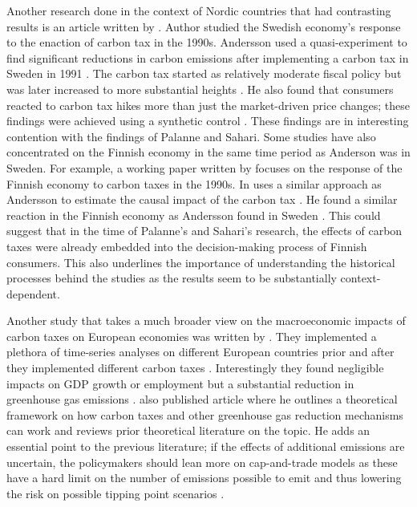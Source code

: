 \documentclass[
  12pt,
  a4paper,
]{report}
\begin{document}
Another research done in the context of Nordic countries that had contrasting results is an article written by \citet{andersson2019}. Author studied the Swedish economy's response to the enaction of carbon tax in the 1990s. Andersson used a quasi-experiment to find significant reductions in carbon emissions after implementing a carbon tax in Sweden in 1991 \citep{andersson2019}. The carbon tax started as relatively moderate fiscal policy but was later increased to more substantial heights \citep{andersson2019}. He also found that consumers reacted to carbon tax hikes more than just the market-driven price changes; these findings were achieved using a synthetic control \citep{andersson2019}. These findings are in interesting contention with the findings of Palanne and Sahari. Some studies have also concentrated on the Finnish economy in the same time period as Anderson was in Sweden. For example, a working paper written by \citet{elbaum2021} focuses on the response of the Finnish economy to carbon taxes in the 1990s. In uses a similar approach as Andersson to estimate the causal impact of the carbon tax \citep{elbaum2021}. He found a similar reaction in the Finnish economy as Andersson found in Sweden \citep{elbaum2021}. This could suggest that in the time of Palanne's and Sahari's research, the effects of carbon taxes were already embedded into the decision-making process of Finnish consumers. This also underlines the importance of understanding the historical processes behind the studies as the results seem to be substantially context-dependent.

Another study that takes a much broader view on the macroeconomic impacts of carbon taxes on European economies was written by \citet{metcalf2020}. They implemented a plethora of time-series analyses on different European countries prior and after they implemented different carbon taxes \citep{metcalf2020}. Interestingly they found negligible impacts on GDP growth or employment but a substantial reduction in greenhouse gas emissions \citep{metcalf2020}. \citet{metcalf2021} also published article where he outlines a theoretical framework on how carbon taxes and other greenhouse gas reduction mechanisms can work and reviews prior theoretical literature on the topic. He adds an essential point to the previous literature; if the effects of additional emissions are uncertain, the policymakers should lean more on cap-and-trade models as these have a hard limit on the number of emissions possible to emit and thus lowering the risk on possible tipping point scenarios \citep{metcalf2021}.
\end{document}

